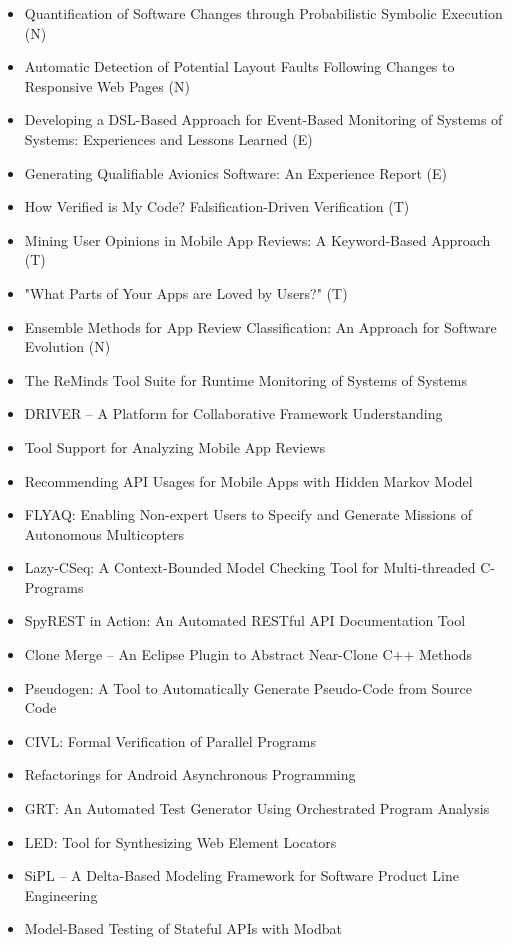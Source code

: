 {\begin{itemize}[itemsep=-1ex]
  \item Quantification of Software Changes through Probabilistic Symbolic Execution (N)
  \item Automatic Detection of Potential Layout Faults Following Changes to Responsive Web Pages (N)
  \item Developing a DSL-Based Approach for Event-Based Monitoring of Systems of Systems: Experiences and Lessons Learned (E)
  \item Generating Qualifiable Avionics Software: An Experience Report (E)
  \item How Verified is My Code? Falsification-Driven Verification (T)
  \item Mining User Opinions in Mobile App Reviews: A Keyword-Based Approach (T)
  \item "What Parts of Your Apps are Loved by Users?" (T)
  \item Ensemble Methods for App Review Classification: An Approach for Software Evolution (N)
  \item The ReMinds Tool Suite for Runtime Monitoring of Systems of Systems
  \item DRIVER -- A Platform for Collaborative Framework Understanding
  \item Tool Support for Analyzing Mobile App Reviews
  \item Recommending API Usages for Mobile Apps with Hidden Markov Model
  \item FLYAQ: Enabling Non-expert Users to Specify and Generate Missions of Autonomous Multicopters
  \item Lazy-CSeq: A Context-Bounded Model Checking Tool for Multi-threaded C-Programs
  \item SpyREST in Action: An Automated RESTful API Documentation Tool
  \item Clone Merge -- An Eclipse Plugin to Abstract Near-Clone C++ Methods
  \item Pseudogen: A Tool to Automatically Generate Pseudo-Code from Source Code
  \item CIVL: Formal Verification of Parallel Programs
  \item Refactorings for Android Asynchronous Programming
  \item GRT: An Automated Test Generator Using Orchestrated Program Analysis
  \item LED: Tool for Synthesizing Web Element Locators
  \item SiPL -- A Delta-Based Modeling Framework for Software Product Line Engineering
  \item Model-Based Testing of Stateful APIs with Modbat

\end{itemize}}
